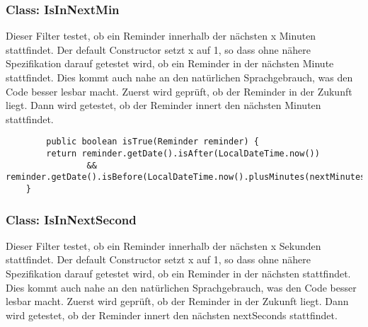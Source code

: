       \subsubsection{Class: IsInNextMin}
      Dieser Filter testet, ob ein Reminder innerhalb der nächsten x Minuten stattfindet.
      Der default Constructor setzt x auf 1, so dass ohne nähere Spezifikation darauf getestet wird, ob ein Reminder in der nächsten Minute stattfindet.
      Dies kommt auch nahe an den natürlichen Sprachgebrauch, was den Code besser lesbar macht.
      Zuerst wird geprüft, ob der Reminder in der Zukunft liegt. Dann wird getestet, ob der Reminder innert den nächsten Minuten stattfindet.
      \begin{lstlisting}
        public boolean isTrue(Reminder reminder) {
        return reminder.getDate().isAfter(LocalDateTime.now())
                && reminder.getDate().isBefore(LocalDateTime.now().plusMinutes(nextMinutes));
    }
      \end{lstlisting}

      \subsubsection{Class: IsInNextSecond}
      Dieser Filter testet, ob ein Reminder innerhalb der nächsten x Sekunden stattfindet.
      Der default Constructor setzt x auf 1, so dass ohne nähere Spezifikation darauf getestet wird, ob ein Reminder in der nächsten stattfindet.
      Dies kommt auch nahe an den natürlichen Sprachgebrauch, was den Code besser lesbar macht.
      Zuerst wird geprüft, ob der Reminder in der Zukunft liegt. Dann wird getestet, ob der Reminder innert den nächsten nextSeconds stattfindet.
